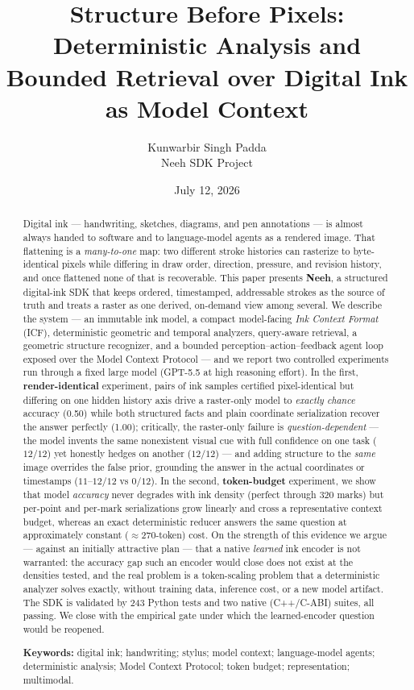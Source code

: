 \documentclass[11pt]{article}
\title{\vspace{-2.5em}\textbf{Structure Before Pixels: Deterministic Analysis and\\
Bounded Retrieval over Digital Ink as Model Context}}
\author{
  Kunwarbir Singh Padda\\
  \small Neeh SDK Project
}
\date{July 12, 2026}
\begin{document}
\maketitle

\begin{abstract}
\noindent
Digital ink --- handwriting, sketches, diagrams, and pen annotations --- is
almost always handed to software and to language-model agents as a rendered
image. That flattening is a \emph{many-to-one} map: two different stroke
histories can rasterize to byte-identical pixels while differing in draw order,
direction, pressure, and revision history, and once flattened none of that is
recoverable. This paper presents \textbf{Neeh}, a structured digital-ink SDK
that keeps ordered, timestamped, addressable strokes as the source of truth and
treats a raster as one derived, on-demand view among several. We describe the
system --- an immutable ink model, a compact model-facing \emph{Ink Context
Format} (ICF), deterministic geometric and temporal analyzers, query-aware
retrieval, a geometric structure recognizer, and a bounded
perception--action--feedback agent loop exposed over the Model Context Protocol
--- and we report two controlled experiments run through a fixed large model
(GPT-5.5 at high reasoning effort). In the first, \textbf{render-identical}
experiment, pairs of ink samples certified pixel-identical but differing on one
hidden history axis drive a raster-only model to \emph{exactly chance} accuracy
(0.50) while both structured facts and plain coordinate serialization recover
the answer perfectly (1.00); critically, the raster-only failure is
\emph{question-dependent} --- the model invents the same nonexistent visual cue
with full confidence on one task ($12/12$) yet honestly hedges on another
($12/12$) --- and adding structure to the \emph{same} image overrides the false
prior, grounding the answer in the actual coordinates or timestamps ($11$--$12/12$
vs $0/12$). In the
second, \textbf{token-budget} experiment, we show that model \emph{accuracy}
never degrades with ink density (perfect through 320 marks) but per-point and
per-mark serializations grow linearly and cross a representative context budget,
whereas an exact deterministic reducer answers the same question at
approximately constant ($\approx$270-token) cost. On the strength of this
evidence we argue --- against an initially attractive plan --- that a native
\emph{learned} ink encoder is not warranted: the accuracy gap such an encoder
would close does not exist at the densities tested, and the real problem is a
token-scaling problem that a deterministic analyzer solves exactly, without
training data, inference cost, or a new model artifact. The SDK is validated by
243 Python tests and two native (C++/C-ABI) suites, all passing. We close with
the empirical gate under which the learned-encoder question would be reopened.

\vspace{0.6em}
\noindent\textbf{Keywords:} digital ink; handwriting; stylus; model context;
language-model agents; deterministic analysis; Model Context Protocol; token
budget; representation; multimodal.
\end{abstract}
\end{document}
